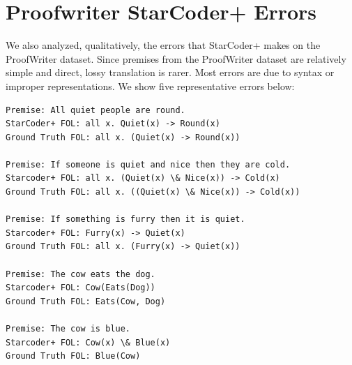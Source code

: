 \section{Proofwriter StarCoder+ Errors} \label{sec:appendix_proofwriter_errors}
We also analyzed, qualitatively, the errors that StarCoder+ makes on the ProofWriter dataset. Since premises from the ProofWriter dataset are relatively simple and direct, lossy translation is rarer. Most errors are due to syntax or improper representations. We show five representative errors below:

\begin{lstlisting}
Premise: All quiet people are round.
StarCoder+ FOL: all x. Quiet(x) -> Round(x)
Ground Truth FOL: all x. (Quiet(x) -> Round(x))

Premise: If someone is quiet and nice then they are cold.
Starcoder+ FOL: all x. (Quiet(x) \& Nice(x)) -> Cold(x)
Ground Truth FOL: all x. ((Quiet(x) \& Nice(x)) -> Cold(x))

Premise: If something is furry then it is quiet.
Starcoder+ FOL: Furry(x) -> Quiet(x)
Ground Truth FOL: all x. (Furry(x) -> Quiet(x))

Premise: The cow eats the dog.
Starcoder+ FOL: Cow(Eats(Dog))
Ground Truth FOL: Eats(Cow, Dog)

Premise: The cow is blue.
Starcoder+ FOL: Cow(x) \& Blue(x)
Ground Truth FOL: Blue(Cow)
\end{lstlisting}